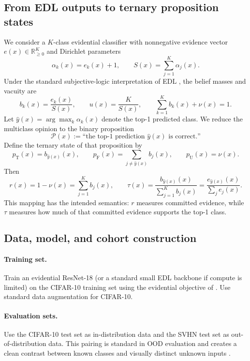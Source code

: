\documentclass[11pt]{article}
\newcommand{\T}{\mathrm{T}}
\newcommand{\F}{\mathrm{F}}
\newcommand{\U}{\mathrm{U}}
\newcommand{\R}{\mathbb{R}}
\newcommand{\1}{\mathbf{1}}
\begin{document}
\subsection{From EDL outputs to ternary proposition states}

We consider a $K$-class evidential classifier with nonnegative evidence vector $e(x)\in\R_{\ge 0}^K$ and Dirichlet parameters
\[
\alpha_k(x)=e_k(x)+1,
\qquad
S(x)=\sum_{j=1}^K \alpha_j(x).
\]
Under the standard subjective-logic interpretation of EDL \citep{SensoyKaplanKandemir18}, the belief masses and vacuity are
\[
b_k(x)=\frac{e_k(x)}{S(x)},
\qquad
u(x)=\frac{K}{S(x)},
\qquad
\sum_{k=1}^K b_k(x)+\nu(x)=1.
\]
Let $\hat y(x)=\arg\max_k \alpha_k(x)$ denote the top-1 predicted class. We reduce the multiclass opinion to the binary proposition
\[
\mathcal{P}(x):=\text{``the top-1 prediction }\hat y(x)\text{ is correct.''}
\]
Define the ternary state of that proposition by
\begin{equation}
 p_\T(x)=b_{\hat y(x)}(x),
 \qquad
 p_\F(x)=\sum_{j\neq \hat y(x)} b_j(x),
 \qquad
 p_\U(x)=\nu(x).
 \label{eq:edl-ternary}
\end{equation}
Then
\begin{equation}
 r(x)=1-\nu(x)=\sum_{j=1}^K b_j(x),
 \qquad
 \tau(x)=\frac{b_{\hat y(x)}(x)}{\sum_{j=1}^K b_j(x)}=\frac{e_{\hat y(x)}(x)}{\sum_j e_j(x)}.
 \label{eq:edl-rtau}
\end{equation}
This mapping has the intended semantics: $r$ measures committed evidence, while $\tau$ measures how much of that committed evidence supports the top-1 class.

\subsection{Data, model, and cohort construction}

\paragraph{Training set.}
Train an evidential ResNet-18 (or a standard small EDL backbone if compute is limited) on the CIFAR-10 training set using the evidential objective of \citet{SensoyKaplanKandemir18}. Use standard data augmentation for CIFAR-10.

\paragraph{Evaluation sets.}
Use the CIFAR-10 test set as in-distribution data and the SVHN test set as out-of-distribution data. This pairing is standard in OOD evaluation and creates a clean contrast between known classes and visually distinct unknown inputs \citep{GengHuangChen21,SensoyKaplanKandemir18}.
\end{document}
